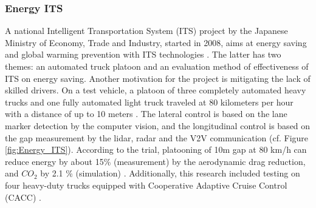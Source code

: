 \subsubsection{Energy ITS}
A national Intelligent Transportation System (ITS) project by the Japanese Ministry of Economy, Trade and Industry, started in 2008, aims at energy saving and global warming prevention with ITS technologies \cite{TSUGAWA201341}\cite{OHTA2023100187}. The latter has two themes: an automated truck platoon and an evaluation method of effectiveness of ITS on energy saving. Another motivation for the project is mitigating the lack of skilled drivers. On a test vehicle, a platoon of three completely automated heavy trucks and one fully automated light truck traveled at 80 kilometers per hour with a distance of up to 10 meters \cite{tsugawa2014results}. The lateral control is based on the lane marker detection by the computer vision, and the longitudinal control is based on the gap measurement by the lidar, radar and the V2V communication (cf. Figure \ref{fig:Energy_ITS}). According to the trial, platooning of 10m gap at 80 km/h can reduce energy by about 15\%  (measurement) by the aerodynamic drag reduction, and $CO_{2}$ by 2.1 \% (simulation) \cite{tsugawa2011automated}. Additionally, this research included testing on four heavy-duty trucks equipped with Cooperative Adaptive Cruise Control (CACC) \cite{tsugawa2014results}. 



